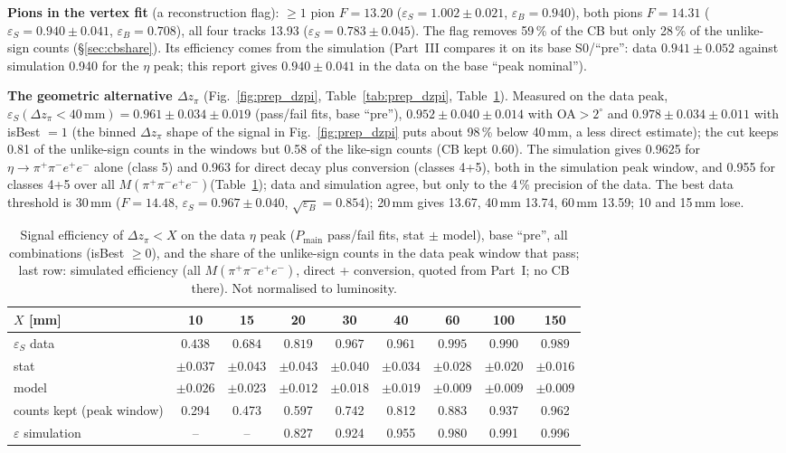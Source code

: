 \documentclass[11pt,a4paper]{article}
\newcommand{\ppee}{\ensuremath{\pi^{+}\pi^{-}e^{+}e^{-}}\xspace}
\newcommand{\Mfour}{\ensuremath{M(\pi^{+}\pi^{-}e^{+}e^{-})}\xspace}
\newcommand{\dzpi}{\ensuremath{\Delta z_\pi}\xspace}
\newcommand{\Pmain}{\ensuremath{P_{\mathrm{main}}}\xspace}
\begin{document}
\textbf{Pions in the vertex fit} (a reconstruction flag): $\ge1$ pion $F=13.20$ ($\varepsilon_S=1.002\pm0.021$,
$\varepsilon_B=0.940$), both pions $F=14.31$ ($\varepsilon_S=0.940\pm0.041$, $\varepsilon_B=0.708$), all four tracks 13.93
($\varepsilon_S=0.783\pm0.045$). The flag removes 59\,\% of the CB but only 28\,\% of the unlike-sign counts (\S\ref{sec:cbshare}).
Its efficiency comes from the simulation (Part~III compares it on its base S0/``pre'': data $0.941\pm0.052$ against simulation 0.940 for the
$\eta$ peak; this report gives $0.940\pm0.041$ in the data on the base ``peak nominal'').

\textbf{The geometric alternative $\dzpi$} (Fig.~\ref{fig:prep_dzpi}, Table~\ref{tab:prep_dzpi}, Table~\ref{tab:dzthr}).
Measured on the data peak, $\varepsilon_S(\dzpi<40\,\mathrm{mm})=0.961\pm0.034\pm0.019$
(pass/fail fits, base ``pre''), $0.952\pm0.040\pm0.014$ with OA$>2^\circ$ and $0.978\pm0.034\pm0.011$ with isBest $=1$ (the
binned \dzpi shape of the signal in Fig.~\ref{fig:prep_dzpi} puts about 98\,\% below 40\,mm, a less direct estimate); the cut
keeps 0.81 of the unlike-sign counts in the windows but 0.58 of the like-sign counts (CB kept 0.60). The simulation gives 0.9625
for $\eta\to\ppee$ alone (class 5) and 0.963 for direct decay plus conversion (classes 4+5), both in the simulation peak
window, and 0.955 for classes 4+5 over all \Mfour (Table~\ref{tab:dzthr}); data and simulation agree, but only to the 4\,\%
precision of the data. The best data threshold is 30\,mm ($F=14.48$,
$\varepsilon_S=0.967\pm0.040$, $\sqrt{\varepsilon_B}=0.854$); 20\,mm gives 13.67, 40\,mm 13.74, 60\,mm 13.59; 10 and 15\,mm lose.

\begin{table}[H]
\centering
\caption{Signal efficiency of $\dzpi<X$ on the data $\eta$ peak (\Pmain pass/fail fits, stat $\pm$ model), base ``pre'',
all combinations (isBest $\ge0$), and the share of the unlike-sign counts in the data peak window that pass; last row:
simulated efficiency (all \Mfour, direct + conversion, quoted from Part~I; no CB there). Not normalised to luminosity.}
\label{tab:dzthr}
\small
\setlength{\tabcolsep}{3pt}
\begin{tabular}{@{}l c c c c c c c c@{}}
\toprule
$X$ [mm] & 10 & 15 & 20 & 30 & 40 & 60 & 100 & 150 \\
\midrule
$\varepsilon_S$ data & $0.438$ & $0.684$ & $0.819$ & $0.967$ & $0.961$ & $0.995$ & $0.990$ & $0.989$ \\
\quad stat & $\pm0.037$ & $\pm0.043$ & $\pm0.043$ & $\pm0.040$ & $\pm0.034$ & $\pm0.028$ & $\pm0.020$ & $\pm0.016$ \\
\quad model & $\pm0.026$ & $\pm0.023$ & $\pm0.012$ & $\pm0.018$ & $\pm0.019$ & $\pm0.009$ & $\pm0.009$ & $\pm0.009$ \\
counts kept (peak window) & 0.294 & 0.473 & 0.597 & 0.742 & 0.812 & 0.883 & 0.937 & 0.962 \\
$\varepsilon$ simulation & -- & -- & 0.827 & 0.924 & 0.955 & 0.980 & 0.991 & 0.996 \\
\bottomrule
\end{tabular}
\end{table}
\end{document}
